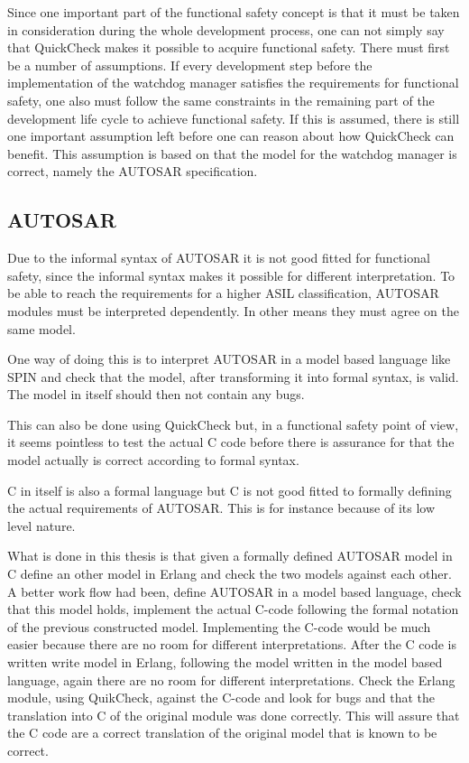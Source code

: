 Since one important part of the functional safety concept is that it
must be taken in consideration during the whole development process,
one can not simply say that QuickCheck makes it possible to acquire
functional safety. There must first be a number of assumptions. If
every development step before the implementation of the watchdog
manager satisfies the requirements for functional safety, one also
must follow the same constraints in the remaining part of the
development life cycle to achieve functional safety. If this is
assumed, there is still one important assumption left before one can
reason about how QuickCheck can benefit. This assumption is based on
that the model for the watchdog manager is correct, namely the AUTOSAR
specification.

\subsection{AUTOSAR}
Due to the informal syntax of AUTOSAR it is not good fitted for
functional safety, since the informal syntax makes it possible for
different interpretation. To be able to reach the requirements for a higher
ASIL classification, AUTOSAR modules must be interpreted dependently. In other
means they must agree on the same model.

One way of doing this is to interpret AUTOSAR in a model based
language like SPIN and check that the model, after transforming it
into formal syntax, is valid. The model in itself should then not
contain any bugs.

This can also be done using QuickCheck but, in a functional safety
point of view, it seems pointless to test the actual C code before
there is assurance for that the model actually is correct according to
formal syntax.

C in itself is also a formal language but C is not good fitted to
formally defining the actual requirements of AUTOSAR. This is for
instance because of its low level nature.

What is done in this thesis is that given a formally defined AUTOSAR
model in C define an other model in Erlang and check the two models
against each other.  A better work flow had been, define AUTOSAR in a
model based language, check that this model holds, implement the
actual C-code following the formal notation of the previous
constructed model. Implementing the C-code would be much easier
because there are no room for different interpretations. After the C
code is written write model in Erlang, following the model written in
the model based language, again there are no room for different
interpretations. Check the Erlang module, using QuikCheck, against the
C-code and look for bugs and that the translation into C of the
original module was done correctly. This will assure that the C code
are a correct translation of the original model that is known to be
correct.

